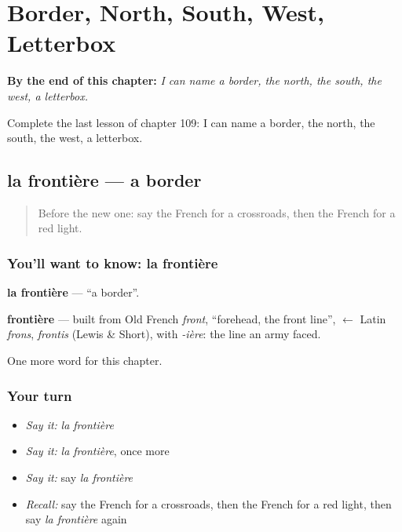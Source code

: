 
\chapter{Border, North, South, West, Letterbox}
\label{ch:fr-border-north-south-west-letterbox}

\begin{chapteropening}
\textbf{By the end of this chapter:} \emph{I can name a border, the north, the south, the west, a letterbox.}

Complete the last lesson of chapter 109: I can name a border, the north, the south, the west, a letterbox.
\end{chapteropening}

\section[la frontière]{la frontière — a border}

\label{lesson:FR-C109-frontiere}



\begin{quote}
Before the new one: say the French for a crossroads, then the French for a red light.
\end{quote}

\subsection*{You'll want to know: la frontière}
\textbf{la frontière} — \textquotedblleft{}a border\textquotedblright{}.

\begin{cousinweb}
\textbf{frontière} — built from Old French \emph{front}, \textquotedblleft{}forehead, the front line\textquotedblright{}, $\leftarrow$ Latin \emph{frons}, \emph{frontis} (Lewis \& Short), with \emph{-ière}: the line an army faced.
\end{cousinweb}

\begin{grammarlens}[title={What you've built}]
One more word for this chapter.
\end{grammarlens}

\subsection*{Your turn}
\begin{itemize}
\raggedright
  \item \emph{Say it:} \emph{la frontière}
  \item \emph{Say it:} \emph{la frontière}, once more
  \item \emph{Say it:} say \emph{la frontière}
  \item \emph{Recall:} say the French for a crossroads, then the French for a red light, then say \emph{la frontière} again
\end{itemize}

